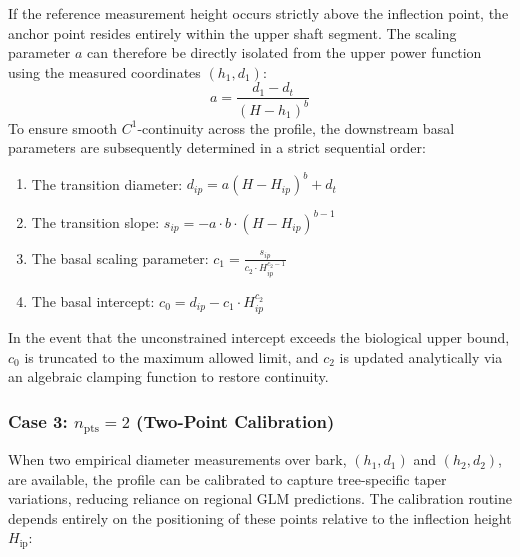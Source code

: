 \documentclass[twocolumn, bibliography=totoc]{scrartcl}
\begin{document}
If the reference measurement height occurs strictly above the inflection point, the anchor point resides entirely within the upper shaft segment. The scaling parameter $a$ can therefore be directly isolated from the upper power function using the measured coordinates $(h_1, d_1)$:
\begin{equation}
    a = \frac{d_1 - d_t}{(H - h_1)^b}
\end{equation}
To ensure smooth $C^1$-continuity across the profile, the downstream basal parameters are subsequently determined in a strict sequential order:
\begin{enumerate}
    \item The transition diameter: $d_{ip} = a(H - H_{ip})^b + d_t$
    \item The transition slope: $s_{ip} = -a \cdot b \cdot (H - H_{ip})^{b-1}$
    \item The basal scaling parameter: $c_1 = \frac{s_{ip}}{c_2 \cdot H_{ip}^{c_2-1}}$
    \item The basal intercept: $c_0 = d_{ip} - c_1 \cdot H_{ip}^{c_2}$
\end{enumerate}
In the event that the unconstrained intercept exceeds the biological upper bound, $c_0$ is truncated to the maximum allowed limit, and $c_2$ is updated analytically via an algebraic clamping function to restore continuity.

\subsubsection{Case 3: $n_{\text{pts}} = 2$ (Two-Point Calibration)}

When two empirical diameter measurements over bark, $(h_1, d_1)$ and $(h_2, d_2)$, are available, the profile can be calibrated to capture tree-specific taper variations, reducing reliance on regional $\text{GLM}$ predictions. The calibration routine depends entirely on the positioning of these points relative to the inflection height $H_{\text{ip}}$:
\end{document}

